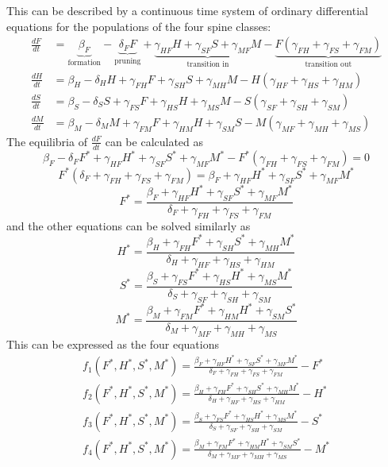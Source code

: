 \documentclass[11pt]{article}
\begin{document}
This can be described by a continuous time system of ordinary differential equations for the populations of the four spine classes:
\begin{equation}\begin{aligned}
\frac{dF}{dt} &= 
\underbrace{\beta_F}_{\text{formation}} 
- \underbrace{\delta_F F}_{\text{pruning}} 
+ \underbrace{\gamma_{HF}H+\gamma_{SF}S+\gamma_{MF}M}_{\text{transition in}}
- \underbrace{F(\gamma_{FH} + \gamma_{FS} + \gamma_{FM})}_{\text{transition out}}\\
\frac{dH}{dt} &= \beta_H - \delta_H H + \gamma_{FH} F + \gamma_{SH} S + \gamma_{MH} M - H (\gamma_{HF} + \gamma_{HS} + \gamma_{HM})\\
\frac{dS}{dt} &= \beta_S - \delta_S S + \gamma_{FS} F + \gamma_{HS} H + \gamma_{MS} M - S (\gamma_{SF} + \gamma_{SH} + \gamma_{SM})\\
\frac{dM}{dt} &= \beta_M - \delta_M M + \gamma_{FM} F + \gamma_{HM} H + \gamma_{SM} S - M (\gamma_{MF} + \gamma_{MH} + \gamma_{MS})
\label{odes}
\end{aligned}\end{equation}
\noindent The equilibria of $\frac{dF}{dt}$ can be calculated as
\[\beta_F - \delta_FF^*+\gamma_{HF}H^*+\gamma_{SF}S^*+\gamma_{MF}M^*-F^*(\gamma_{FH}+\gamma_{FS}+\gamma_{FM}) = 0\]
\[F^* (\delta_F+\gamma_{FH}+\gamma_{FS}+\gamma_{FM}) =\beta_F+\gamma_{HF}H^*+\gamma_{SF}S^*+\gamma_{MF}M^*\]
\[F^*=\frac{\beta_F+\gamma_{HF}H^*+\gamma_{SF}S^*+\gamma_{MF}M^*}{\delta_F+\gamma_{FH}+\gamma_{FS}+\gamma_{FM}}\]
and the other equations can be solved similarly as
\[H^*=\frac{\beta_H+\gamma_{FH}F^*+\gamma_{SH}S^*+\gamma_{MH}M^*}{\delta_H+\gamma_{HF}+\gamma_{HS}+\gamma_{HM}}\]
\[S^*=\frac{\beta_S+\gamma_{FS}F^*+\gamma_{HS}H^*+\gamma_{MS}M^*}{\delta_S+\gamma_{SF}+\gamma_{SH}+\gamma_{SM}}\]
\[M^*=\frac{\beta_M+\gamma_{FM}F^*+\gamma_{HM}H^*+\gamma_{SM}S^*}{\delta_M+\gamma_{MF}+\gamma_{MH}+\gamma_{MS}}\]
\noindent This can be expressed as the four equations
\begin{equation}\begin{aligned}
f_1(F^*, H^*, S^*, M^*)=\frac{\beta_F+\gamma_{HF}H^*+\gamma_{SF}S^*+\gamma_{MF}M^*}{\delta_F+\gamma_{FH}+\gamma_{FS}+\gamma_{FM}}-F^* \\
f_2(F^*, H^*, S^*,M^*) =\frac{\beta_H+\gamma_{FH}F^*+\gamma_{SH}S^*+\gamma_{MH}M^*}{\delta_H+\gamma_{HF}+\gamma_{HS}+\gamma_{HM}}-H^* \\
f_3(F^*, H^*, S^*,M^*) =\frac{\beta_S+\gamma_{FS}F^*+\gamma_{HS}H^*+\gamma_{MS}M^*}{\delta_S+\gamma_{SF}+\gamma_{SH}+\gamma_{SM}}-S^* \\
f_4(F^*, H^*, S^*,M^*) =\frac{\beta_M+\gamma_{FM}F^*+\gamma_{HM}H^*+\gamma_{SM}S^*}{\delta_M+\gamma_{MF}+\gamma_{MH}+\gamma_{MS}}-M^*
\label{funcs}
\end{aligned}\end{equation}
\end{document}
